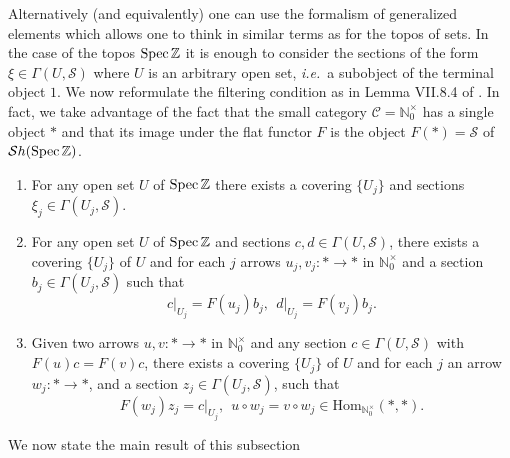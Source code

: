 \documentclass[noams,lp]{compositio}
\def\Hom{{\rm Hom}}
\def\Spec{{\rm Spec\,}}
\def\N{{\mathbb N}}
\def\Z{{\mathbb Z}}
\def\cC{{\mathcal C}}
\def\cS{{\mathcal S}}
\newcommand{\ie}{{\it i.e.\/}\ }
\def\spz{{\Spec\Z}}
\def\Hom {{\mbox{Hom}}}
\def\nto{\N_0^{\times}}
\begin{document}
Alternatively (and equivalently) one can use the formalism of generalized elements which allows one to think in  similar terms as for the topos of sets. In the case of  the topos $\spz$ it is enough to consider the sections of the form $\xi\in\Gamma(U,\cS)$ where $U$ is an arbitrary open set, \ie a subobject of the terminal object $1$. We now reformulate the filtering condition as in Lemma VII.8.4 of \cite{MM}. In fact, we take advantage of the fact that the small category $\cC=\nto$ has a single object $\ast$ and that its image under the flat functor $F$ is the object $F(\ast)=\cS$ of ${\mathcal Sh}(\Spec\Z)$. 
\begin{enumerate}
\item For any open set $U$ of $\spz$ there exists a covering $\{U_j\}$ and sections $\xi_j\in \Gamma(U_j,\cS)$.
\item For any open set $U$ of $\spz$ and sections   $c,d\in\Gamma(U, \cS)$, there exists  a covering $\{U_j\}$ of $U$ and for each $j$ arrows $u_j,v_j:\ast \to \ast$ in $\nto$ and a section $b_j\in \Gamma(U_j,\cS)$ such that 
$$
c\vert_{U_j}=F(u_j)b_j, \  \  d\vert_{U_j}=F(v_j)b_j.
$$
\item Given two  arrows $u,v:\ast \to \ast$ in $\nto$ and any section $c\in\Gamma(U,\cS)$ with $F(u)c=F(v)c$, there
exists a covering $\{U_j\}$ of $U$ and for each $j$ an arrow $w_j:\ast \to \ast$,  and a section $z_j\in\Gamma(U_j,\cS)$, such that 
$$
F(w_j)z_j=c\vert_{U_j}, \  \  u\circ w_j=v\circ w_j\in \Hom_{\nto}(\ast,\ast).
$$
\end{enumerate}
We  now state the main result of this subsection 
\end{document}
